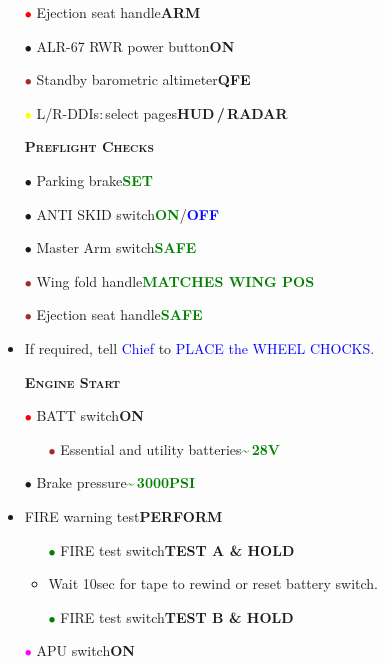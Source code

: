 \documentclass[a4paper,12pt,dvipsnames]{letter}
\newcommand{\radio}[1]{\textcolor{blue}{#1}}
\newcommand{\button}[1]{\textbf{#1}}
\newcommand{\ok}[1]{\textcolor{Green}{\textbf{#1}}}
\newcommand{\boat}[1]{\textcolor{Blue}{\textbf{#1}}}
\newcommand{\myHead}[1]{{\LARGE\textsc{\textbf{#1}}}}
\newcommand{\bi}{\textcolor{ProcessBlue}{$\bullet$\;}}
\newcommand{\ri}{\textcolor{Red}{$\bullet$\;}}
\newcommand{\gi}{\textcolor{Green}{$\bullet$\;}}
\newcommand{\yi}{\textcolor{Yellow}{$\bullet$\;}}
\newcommand{\mi}{\textcolor{Magenta}{$\bullet$\;}}
\newcommand{\ai}{\textcolor{Apricot}{$\bullet$\;}}
\renewcommand{\ni}{\textcolor{Brown}{$\bullet$\;}}
\begin{document}
{\begin{itemize}
 \item[\ri] Ejection seat handle\dotfill\button{ARM}
 \item[\ai] ALR-67 RWR power button\dotfill\button{ON}
 \item[\ni] Standby barometric altimeter\dotfill\button{QFE}
 \item[\yi] L/R-DDIs:\,select pages\dotfill\button{HUD\,/\,RADAR}
\end{itemize}
\newpage
\begin{itemize}
 \item[] \myHead{Preflight Checks}
 \item[\bi] Parking brake\dotfill\ok{SET}
 \item[\bi] ANTI SKID switch\dotfill\ok{ON}/\boat{OFF}
 \item[\bi] Master Arm switch\dotfill\ok{SAFE}
 \item[\ni] Wing fold handle\dotfill\ok{MATCHES WING POS}
 \item[\ni] Ejection seat handle\dotfill\ok{SAFE}
 \item If required, tell \radio{Chief} to \radio{PLACE the WHEEL CHOCKS}.
\end{itemize}
\vspace{0.5em}
\begin{itemize}
 \item[] \myHead{Engine Start} 
 \item[\ri] BATT switch\dotfill\button{ON}
 \begin{itemize}
  \item[\ni] Essential and utility batteries\dotfill\ok{\textasciitilde\,28\;V}
 \end{itemize}
 \item[\bi] Brake pressure\dotfill\ok{\textasciitilde\,3000\;PSI}
 \item FIRE warning test\dotfill\button{PERFORM}
 \begin{itemize}
  \item[\gi] FIRE test switch\dotfill\button{TEST A \& HOLD}
  \item Wait 10\;sec for tape to rewind or reset battery switch.
  \item[\gi] FIRE test switch\dotfill\button{TEST B \& HOLD}
 \end{itemize}
 \item[\mi] APU switch\dotfill\button{ON}

\end{itemize}}
\end{document}
